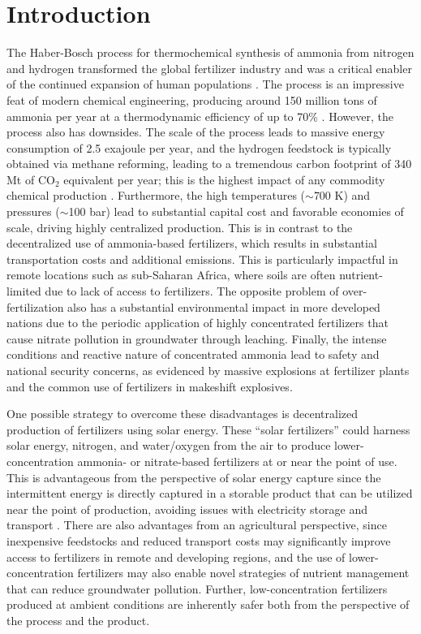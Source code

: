 \section{Introduction}

The Haber-Bosch process for thermochemical synthesis of ammonia from nitrogen and hydrogen transformed the global fertilizer industry and was a critical enabler of the continued expansion of human populations \cite{Smil_1999}. The process is an impressive feat of modern chemical engineering, producing around 150 million tons of ammonia per year at a thermodynamic efficiency of up to 70\% \cite{Schloegl_2003,Schiffer_2017}. However, the process also has downsides. The scale of the process leads to massive energy consumption of 2.5 exajoule per year, and the hydrogen feedstock is typically obtained via methane reforming, leading to a tremendous carbon footprint of 340 Mt of CO$_2$ equivalent per year; this is the highest impact of any commodity chemical production \cite{Schiffer_2017}. Furthermore, the high temperatures ($\sim$700 K) and pressures ($\sim$100 bar) lead to substantial capital cost and favorable economies of scale, driving highly centralized production. This is in contrast to the decentralized use of ammonia-based fertilizers, which results in substantial transportation costs and additional emissions. This is particularly impactful in remote locations such as sub-Saharan Africa, where soils are often nutrient-limited due to lack of access to fertilizers\cite{Gilbert_2012, Mueller_2012}. The opposite problem of over-fertilization also has a substantial environmental impact in more developed nations due to the periodic application of highly concentrated fertilizers that cause nitrate pollution in groundwater through leaching. Finally, the intense conditions and reactive nature of concentrated ammonia lead to safety and national security concerns, as evidenced by massive explosions at fertilizer plants and the common use of fertilizers in makeshift explosives.

One possible strategy to overcome these disadvantages is decentralized production of fertilizers using solar energy. These ``solar fertilizers'' could harness solar energy, nitrogen, and water/oxygen from the air to produce lower-concentration ammonia- or nitrate-based fertilizers at or near the point of use. This is advantageous from the perspective of solar energy capture since the intermittent energy is directly captured in a storable product that can be utilized near the point of production, avoiding issues with electricity storage and transport \cite{MacKay_2013}. There are also advantages from an agricultural perspective, since inexpensive feedstocks and reduced transport costs may significantly improve access to fertilizers in remote and developing regions, and the use of lower-concentration fertilizers may also enable novel strategies of nutrient management that can reduce groundwater pollution. Further, low-concentration fertilizers produced at ambient conditions are inherently safer both from the perspective of the process and the product. 


